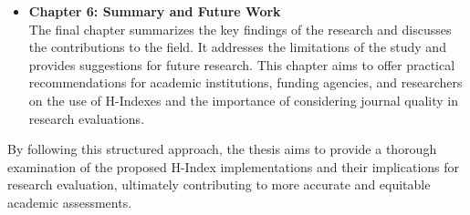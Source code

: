 \begin{itemize}
    \item \textbf{Chapter 6: Summary and Future Work} \\
          The final chapter summarizes the key findings of the research and discusses
          the contributions to the field. It addresses the limitations of the study and provides
          suggestions for future research. This chapter aims to offer practical recommendations
          for academic institutions, funding agencies, and researchers on the use of H-Indexes and the
          importance of considering journal quality in research evaluations.
\end{itemize}

By following this structured approach, the thesis aims to provide a thorough
examination of the proposed H-Index implementations and their implications for
research evaluation, ultimately contributing to more accurate and equitable
academic assessments.

